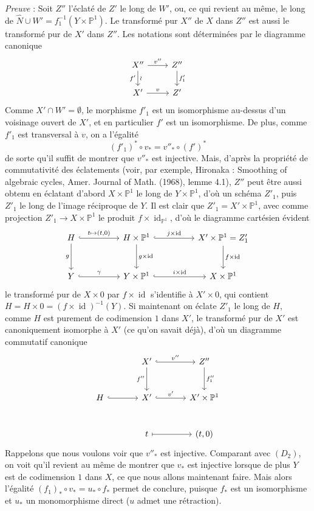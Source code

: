 \emph{Preuve} : Soit $Z''$ l'éclaté de $Z'$ le long de $W'$, ou, ce qui revient au même, le long de $\widehat N\cup W'=f_1^{-1}(Y\times\mathbb{P}^1)$. Le transformé pur $X''$ de $X$ dans $Z''$ est aussi le transformé pur de $X'$ dans $Z''$. Les notations sont déterminées par le diagramme canonique
\[
\begin{tikzcd}
X''\arrow[r,"v''"]\arrow[d,"f'"',"\wr"]&Z''\arrow[d,"f'_1"]\\
X'\arrow[r,"v"]&Z'
\end{tikzcd}
\]
Comme $X'\cap W'=\emptyset$, le morphisme $f'_1$ est un isomorphisme au-dessus d'un voisinage ouvert de $X'$, et en particulier $f'$ est un isomorphisme. De plus, comme $f'_1$ est transversal à $v$, on a l'égalité
\[
(f'_1)^*\circ v_*=v''_*\circ(f')^*
\tag{9.8.8}
\]
de sorte qu'il suffit de montrer que $v''_*$ est injective. Mais, d'après la propriété de commutativité des éclatements (voir, par exemple, Hironaka : Smoothing of algebraic cycles, Amer. Journal of Math. (1968), lemme 4.1), $Z''$ peut être aussi obtenu en éclatant d'abord $X\times\mathbb{P}^1$ le long de $Y\times\mathbb{P}^1$, d'où un schéma $Z'_1$, puis $Z'_1$ le long de l'image réciproque de $Y$. Il est clair que $Z'_1=X'\times\mathbb{P}^1$, avec comme projection $Z'_1\to X\times\mathbb{P}^1$ le produit $f\times\operatorname{id}_{\mathbb{P}^1}$, d'où le diagramme cartésien évident
\[
\begin{tikzcd}[column sep=huge,row sep=large]
H\arrow[r,hook,"{t\mapsto(t,0)}"]\arrow[d,"g"']&H\times\mathbb{P}^1\arrow[r,hook,"{j\times\operatorname{id}}"]\arrow[d,"{g\times\operatorname{id}}"]&X'\times\mathbb{P}^1=Z'_1\arrow[d,"{f\times\operatorname{id}}"]\\
Y\arrow[r,hook,"\gamma"]&Y\times\mathbb{P}^1\arrow[r,hook,"{i\times\operatorname{id}}"]&X\times\mathbb{P}^1
\end{tikzcd}
\]
le transformé pur de $X\times0$ par $f\times\operatorname{id}$ s'identifie à $X'\times0$, qui contient $H=H\times0=(f\times\operatorname{id})^{-1}(Y)$. Si maintenant on éclate $Z'_1$ le long de $H$, comme $H$ est purement de codimension $1$ dans $X'$, le transformé pur de $X'$ est canoniquement isomorphe à $X'$ (ce qu'on savait déjà), d'où un diagramme commutatif canonique
\[
\begin{tikzcd}[column sep=large,row sep=large]
&X'\arrow[r,hook,"v''"]\arrow[d,"f''"']&Z''\arrow[d,"f''_1"]\\
H\arrow[r,hook]&X'\arrow[r,hook,"v'"]&X'\times\mathbb{P}^1\\
&t\arrow[r,mapsto]&{(t,0)}
\end{tikzcd}
\]
Rappelons que nous voulons voir que $v''_*$ est injective. Comparant avec $(D_2)$, on voit qu'il revient au même de montrer que $v_*$ est injective lorsque de plus $Y$ est de codimension $1$ dans $X$, ce que nous allons maintenant faire. Mais alors l'égalité $(f_1)_*\circ v_*=u_*\circ f_*$ permet de conclure, puisque $f_*$ est un isomorphisme et $u_*$ un monomorphisme direct ($u$ admet une rétraction).

